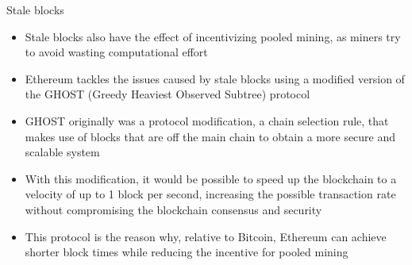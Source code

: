 \documentclass[9pt]{beamer}
\begin{document}

\begin{frame}{Stale blocks}
	\begin{itemize}

		\item Stale blocks also have the effect of incentivizing pooled mining, as miners try to avoid wasting computational effort
		\item Ethereum tackles the issues caused by stale blocks using a modified version of the GHOST (Greedy Heaviest Observed Subtree) protocol
		\item GHOST originally was a protocol modification, a chain selection rule, that makes use of blocks that are off the main chain to obtain a more secure and scalable system
		\item With this modification, it would be possible to speed up the blockchain to a velocity of up to 1 block per second, increasing the possible transaction rate without compromising the blockchain consensus and security
		\item This protocol is the reason why, relative to Bitcoin, Ethereum can achieve shorter block times while reducing the incentive for pooled mining
	\end{itemize}
\end{frame}


\end{document}
